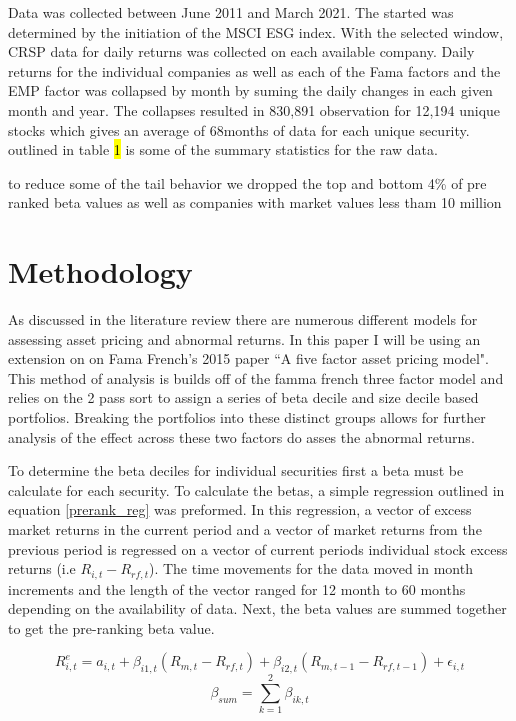 \documentclass[12pt,oneside,reqno]{amsart}
\begin{document}
 
 Data was collected between June 2011 and March 2021. The started was determined by the initiation of the MSCI ESG index. With the selected window, CRSP data for daily returns was collected on each available company. Daily returns for the individual companies as well as each of the Fama factors and the EMP factor was collapsed by month by suming the daily changes in each given month and year. The collapses resulted in 830,891 observation for 12,194 unique stocks which gives an average of 68months of data for each unique security.  outlined in table \hl{1} is some of the summary statistics for the raw data.

to reduce some of the tail behavior we dropped the top and bottom  4\% of pre ranked beta values as well as companies with market values less tham 10 million
\section{Methodology}
\label{Methodology}
As discussed in the literature review there are numerous different models for assessing asset pricing and abnormal returns. In this paper I will be using an extension on on Fama French's 2015 paper ``A five factor asset pricing model". This method of analysis is builds off of the famma french three factor model and relies on the 2 pass sort to assign a series of beta decile and size decile based portfolios. Breaking the portfolios into these distinct groups allows for further analysis of the effect across these two factors do asses the abnormal returns. 

To determine the beta deciles for individual securities first a beta must be calculate for each security. To calculate the betas, a  simple regression outlined in equation \eqref{prerank_reg} was preformed. In this regression, a vector of  excess market returns in the current period and a vector of market returns from the previous period is regressed on a vector of current periods individual stock excess returns (i.e $R_{i,t}-R_{rf,t}$). The time movements for the data moved in month increments and the length of the vector ranged for 12 month to 60 months depending on the availability of data. Next, the beta values are summed together to get the pre-ranking beta value. 

\begin{equation}
    R_{i,t}^e = a_{i,t} + \beta_{i1,t}(R_{m,t}-R_{rf,t})+\beta_{i2,t}(R_{m,t-1}-R_{rf,t-1})+\epsilon_{i,t}
    \label{prerank_reg}
\end{equation}
\begin{equation}
    \beta_{sum} = \sum_{k=1}^2\beta_{ik,t}
\end{equation}
\end{document}
